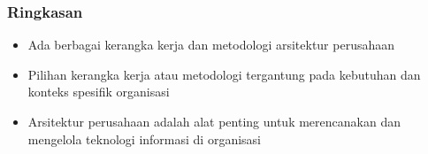 \documentclass{beamer}
\begin{document}
	\begin{frame}
		\frametitle{Ringkasan}
		\begin{itemize}
			\item Ada berbagai kerangka kerja dan metodologi arsitektur perusahaan
			\item Pilihan kerangka kerja atau metodologi tergantung pada kebutuhan dan konteks spesifik organisasi
			\item Arsitektur perusahaan adalah alat penting untuk merencanakan dan mengelola teknologi informasi di organisasi
		\end{itemize}
	\end{frame}
\end{document}
